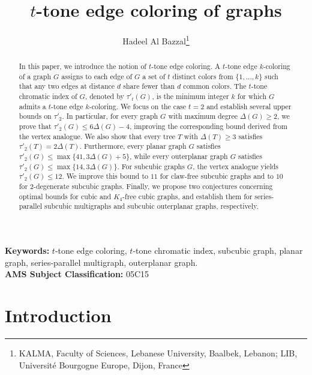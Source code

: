 \documentclass[12pt]{article}
\author{
Hadeel Al Bazzal\thanks{KALMA, Faculty of Sciences, Lebanese University, Baalbek, Lebanon; LIB, Universit\'e Bourgogne Europe, Dijon, France}}
\theoremstyle{plain}
\numberwithin{theorem}{section}
\numberwithin{conjecture}{section}
\numberwithin{corollary}{section}
\numberwithin{example}{section}
\numberwithin{lemma}{section}
\numberwithin{proposition}{section}
\numberwithin{problem}{section}
\numberwithin{remark}{section}
\numberwithin{claim}{theorem}
\numberwithin{definition}{section}
\begin{document}
\title{$t$-tone edge coloring of graphs}
\maketitle

\begin{abstract}
In this paper, we introduce the notion of $t$-tone edge coloring. A $t$-tone edge $k$-coloring of a graph $G$ assigns to each edge of $G$ a set of $t$ distinct colors from $\{1,\dots,k\}$ such that any two edges at distance $d$ share fewer than $d$ common colors. The $t$-tone chromatic index of $G$, denoted by $\tau'_t(G)$, is the minimum integer $k$ for which $G$ admits a $t$-tone edge $k$-coloring. We focus on the case $t=2$ and establish several upper bounds on $\tau'_2$. In particular, for every graph $G$ with maximum degree $\Delta(G)\ge2$, we prove that $\tau'_2(G)\le 6\Delta(G)-4$, improving the corresponding bound derived from the vertex analogue. We also show that every tree $T$ with $\Delta(T)\ge3$ satisfies $\tau'_2(T)=2\Delta(T)$. Furthermore, every planar graph $G$ satisfies $\tau'_2(G)\le \max\{41,3\Delta(G)+5\}$, while every outerplanar graph $G$ satisfies $\tau'_2(G)\le \max\{14,3\Delta(G)\}$. For subcubic graphs $G$, the vertex analogue yields $\tau'_2(G)\le12$. We improve this bound to $11$ for claw-free subcubic graphs and to $10$ for $2$-degenerate subcubic graphs. Finally, we propose two conjectures concerning optimal bounds for cubic and $K_4$-free cubic graphs, and establish them for series-parallel subcubic multigraphs and subcubic outerplanar graphs, respectively.
\end{abstract}

\textbf{Keywords:} $t$-tone edge coloring, $t$-tone chromatic index, subcubic graph, planar graph, series-parallel multigraph, outerplanar graph.\\

\noindent \textbf{AMS Subject Classification:} 05C15

\section{Introduction}
\end{document}
